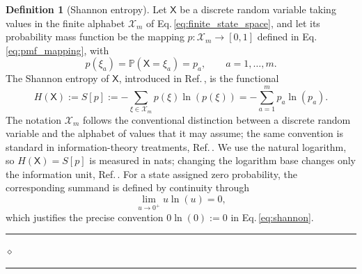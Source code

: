 \documentclass[11pt,a4paper]{article}
\theoremstyle{definition}
\newtheorem{definition}{Definition}[section]
\theoremstyle{plain}
\newcommand{\definitionseparator}{%
    \par\nobreak\vspace{0.15em}%
    \noindent\hfill
    \rule{0.19\linewidth}{0.30pt}%
    \hspace{0.65em}%
    {\scriptsize$\diamond$}%
    \hspace{0.65em}%
    \rule{0.19\linewidth}{0.30pt}%
    \hfill\mbox{}%
    \par\vspace{0.35em}%
}
\begin{document}
\begin{definition}[Shannon entropy]
\label{def:shannon_entropy}
Let \(\mathsf{X}\) be a discrete random variable taking values in the finite alphabet \(\mathcal{X}_m\) of Eq.\,\eqref{eq:finite_state_space}, and let its probability mass function be the mapping \(p:\mathcal{X}_m\to[0,1]\) defined in Eq.\,\eqref{eq:pmf_mapping}, with
\begin{equation}
    p(\xi_a)
    =\mathbb{P}\!\left(\mathsf{X}=\xi_a\right)
    =p_a,
    \qquad a=1,\ldots,m.
    \label{eq:random_variable_pmf}
\end{equation}
The Shannon entropy of \(\mathsf{X}\), introduced in Ref.\,\cite{shannon1948}, is the functional
\begin{equation}
    H(\mathsf{X})
    :=S[p]
    :=-\sum_{\xi\in\mathcal{X}_m}p(\xi)\ln\left(p(\xi)\right)
    =-\sum_{a=1}^{m}p_a\ln\left(p_a\right).
    \label{eq:shannon}
\end{equation}
The notation \(\mathcal{X}_m\) follows the conventional distinction between a discrete random variable and the alphabet of values that it may assume; the same convention is standard in information-theory treatments, Ref.\,\cite{cover2006}. We use the natural logarithm, so \(H(\mathsf{X})=S[p]\) is measured in nats; changing the logarithm base changes only the information unit, Ref.\,\cite{shannon1948,cover2006}. For a state assigned zero probability, the corresponding summand is defined by continuity through
\begin{equation}
    \lim_{u\to0^+}u\ln\left(u\right)=0,
    \label{eq:xlogx_limit}
\end{equation}
which justifies the precise convention \(0\ln\left(0\right):=0\) in Eq.\,\eqref{eq:shannon}.
\end{definition}
\definitionseparator
\end{document}
